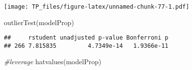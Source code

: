 \documentclass[
]{article}
\newenvironment{Shaded}{\begin{snugshade}}{\end{snugshade}}
\newcommand{\CommentTok}[1]{\textcolor[rgb]{0.56,0.35,0.01}{\textit{#1}}}
\newcommand{\FunctionTok}[1]{\textcolor[rgb]{0.00,0.00,0.00}{#1}}
\newcommand{\NormalTok}[1]{#1}
\begin{document}
\texttt{[image: TP\_files/figure-latex/unnamed-chunk-77-1.pdf]}

\begin{Shaded}
\begin{Highlighting}[]
\FunctionTok{outlierTest}\NormalTok{(modelProp)}
\end{Highlighting}
\end{Shaded}

\begin{verbatim}
##     rstudent unadjusted p-value Bonferroni p
## 266 7.815835         4.7349e-14   1.9366e-11
\end{verbatim}

\begin{Shaded}
\begin{Highlighting}[]
\CommentTok{\#leverage}
\FunctionTok{hatvalues}\NormalTok{(modelProp)}
\end{Highlighting}
\end{Shaded}
\end{document}
